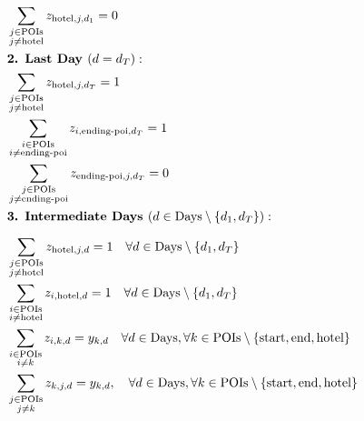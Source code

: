 \documentclass[sigconf,authordraft]{acmart}
\begin{document}
\begin{align}
    & \sum_{\substack{j \in \text{POIs} \\ j \neq \text{hotel}}} z_{\text{hotel},j,d_1} = 0  \\
    & \textbf{2. Last Day } (d = d_T): \notag \\
    & \sum_{\substack{j \in \text{POIs} \\ j \neq \text{hotel}}} z_{\text{hotel},j,d_T} = 1 \\
    & \sum_{\substack{i \in \text{POIs} \\ i \neq \text{ending-poi}}} z_{i,\text{ending-poi},d_T} = 1 \\
    & \sum_{\substack{j \in \text{POIs} \\ j \neq \text{ending-poi}}} z_{\text{ending-poi},j,d_T} = 0 \\
    & \textbf{3. Intermediate Days } (d \in \text{Days} \setminus \{d_1, d_T\}): \notag \\[0.2cm]
    & \sum_{\substack{j \in \text{POIs} \\ j \neq \text{hotel}}} z_{\text{hotel},j,d} = 1 \quad \forall d \in \text{Days} \setminus \{d_1, d_T\} \\
    & \sum_{\substack{i \in \text{POIs} \\ i \neq \text{hotel}}} z_{i,\text{hotel},d} = 1 \quad \forall d \in \text{Days} \setminus \{d_1, d_T\} \\
    & \sum_{\substack{i \in \text{POIs} \\ i \neq k}} z_{i,k,d} = y_{k,d}
    \quad \forall d \in \text{Days},\forall k \in \text{POIs} \setminus \{\text{start}, \text{end}, \text{hotel}\}\\
    & \sum_{\substack{j \in \text{POIs} \\ j \neq k}} z_{k,j,d} = y_{k,d}, \quad \forall d \in \text{Days}, \forall k \in \text{POIs} \setminus \{\text{start}, \text{end}, \text{hotel}\}
     \end{align}
\end{document}

